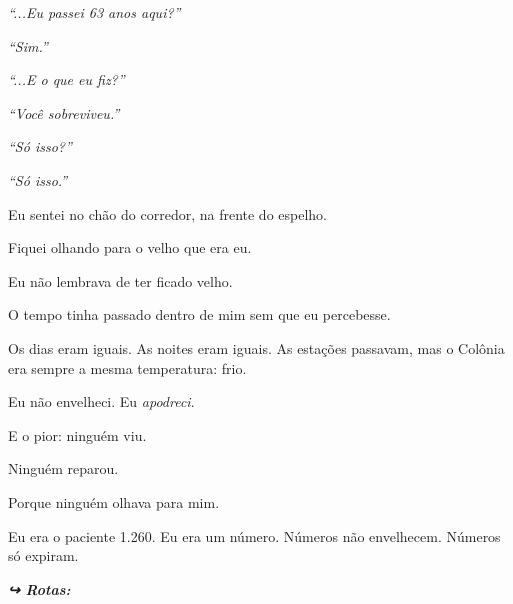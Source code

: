 \noindent \textit{\textquotedblleft{}...Eu passei 63 anos aqui?\textquotedblright{}}

\noindent \textit{\textquotedblleft{}Sim.\textquotedblright{}}

\noindent \textit{\textquotedblleft{}...E o que eu fiz?\textquotedblright{}}

\noindent \textit{\textquotedblleft{}Você sobreviveu.\textquotedblright{}}

\noindent \textit{\textquotedblleft{}Só isso?\textquotedblright{}}

\noindent \textit{\textquotedblleft{}Só isso.\textquotedblright{}}

\noindent Eu sentei no chão do corredor, na frente do espelho.

\noindent Fiquei olhando para o velho que era eu.

\noindent Eu não lembrava de ter ficado velho.

\noindent O tempo tinha passado dentro de mim sem que eu percebesse.

\noindent Os dias eram iguais. As noites eram iguais. As estações passavam, mas o Colônia era sempre a mesma temperatura: frio.

\noindent Eu não envelheci.
Eu \textit{apodreci}.

\noindent E o pior: ninguém viu.

\noindent Ninguém reparou.

\noindent Porque ninguém olhava para mim.

\noindent Eu era o paciente 1.260.
Eu era um número.
Números não envelhecem.
Números só expiram.

\vspace{0.5em}
\noindent\textit{\textbf{↪ Rotas:}  \rotasep {}}
